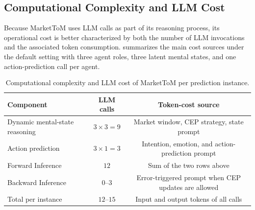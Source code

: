 \documentclass[a4paper,fleqn,doubleblind]{cas-sc}
\newcommand{\revise}[1]{{\color{blue}#1}}
\begin{document}
\revise{
\subsection{Computational Complexity and LLM Cost}
\label{sec:complexity_cost}
Because MarketToM uses LLM calls as part of its reasoning process, its operational cost is better characterized by both the number of LLM invocations and the associated token consumption. \Cref{tab:complexity_cost} summarizes the main cost sources under the default setting with three agent roles, three latent mental states, and one action-prediction call per agent.

\begin{table}[htbp]
\centering
\small
\caption{Computational complexity and LLM cost of MarketToM per prediction instance.}
\label{tab:complexity_cost}
\begin{tabular}{lcc}
\toprule
\textbf{Component} & \textbf{LLM calls} & \textbf{Token-cost source} \\
\midrule
Dynamic mental-state reasoning & $3 \times 3 = 9$ & Market window, CEP strategy, state prompt \\
Action prediction & $3 \times 1 = 3$ & Intention, emotion, and action-prediction prompt \\
Forward Inference & $12$ & Sum of the two rows above \\
Backward Inference & $0$--$3$ & Error-triggered prompt when CEP updates are allowed \\
\midrule
Total per instance & $12$--$15$ & Input and output tokens of all calls \\
\bottomrule
\end{tabular}
\end{table}

}
\end{document}
